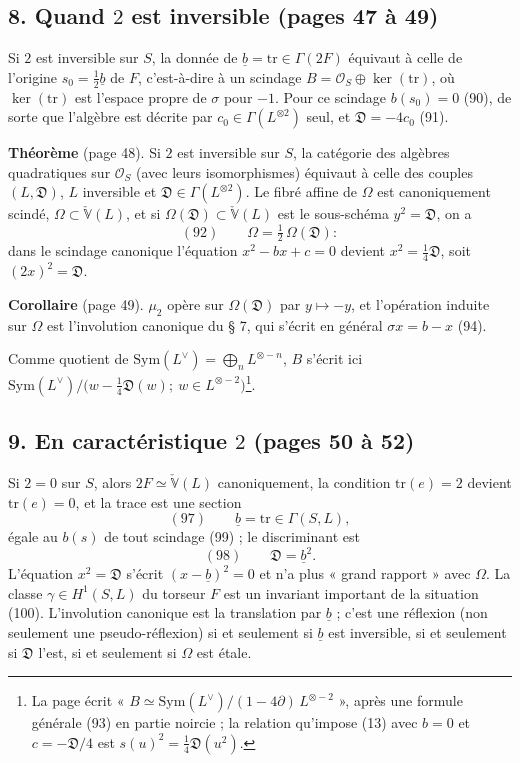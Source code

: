 \documentclass[11pt,a4paper]{article}
\begin{document}
\subsection*{8. Quand $2$ est inversible (pages 47 à 49)}

Si $2$ est inversible sur $S$, la donnée de $\underline{b} = \mathrm{tr} \in \Gamma(2F)$
équivaut à celle de l'origine $s_0 = \tfrac{1}{2}\underline{b}$ de $F$, c'est-à-dire à
un scindage $B = \mathcal{O}_S \oplus \ker(\mathrm{tr})$, où $\ker(\mathrm{tr})$ est
l'espace propre de $\sigma$ pour $-1$. Pour ce scindage $b(s_0) = 0$ (90), de sorte
que l'algèbre est décrite par $c_0 \in \Gamma(L^{\otimes 2})$ seul, et
$\mathfrak{D} = -4c_0$ (91).

\textbf{Théorème} (page 48). Si $2$ est inversible sur $S$, la catégorie des
algèbres quadratiques sur $\mathcal{O}_S$ (avec leurs isomorphismes) équivaut à celle
des couples $(L, \mathfrak{D})$, $L$ inversible et $\mathfrak{D} \in \Gamma(L^{\otimes
2})$. Le fibré affine de $\Omega$ est canoniquement scindé, $\Omega \subset
\check{\mathbb{V}}(L)$, et si $\Omega(\mathfrak{D}) \subset \check{\mathbb{V}}(L)$ est le
sous-schéma $y^2 = \mathfrak{D}$, on a
\[
  (92) \qquad \Omega = \tfrac{1}{2}\,\Omega(\mathfrak{D}) :
\]
dans le scindage canonique l'équation $x^2 - bx + c = 0$ devient $x^2 =
\tfrac{1}{4}\mathfrak{D}$, soit $(2x)^2 = \mathfrak{D}$.

\textbf{Corollaire} (page 49). $\mu_2$ opère sur $\Omega(\mathfrak{D})$ par $y \mapsto
-y$, et l'opération induite sur $\Omega$ est l'involution canonique du § 7, qui
s'écrit en général $\sigma x = b - x$ (94).

Comme quotient de $\mathrm{Sym}(L^{\vee}) = \bigoplus_n L^{\otimes -n}$, $B$ s'écrit
ici $\mathrm{Sym}(L^{\vee})/\bigl(w - \tfrac{1}{4}\mathfrak{D}(w) ;\ w \in L^{\otimes
-2}\bigr)$\footnote{La page écrit « $B \simeq \mathrm{Sym}(L^{\vee})/(1 -
4\partial)\,L^{\otimes -2}$ », après une formule générale (93) en partie noircie ;
la relation qu'impose (13) avec $b = 0$ et $c = -\mathfrak{D}/4$ est $s(u)^2 =
\tfrac{1}{4}\mathfrak{D}(u^2)$.}.

\subsection*{9. En caractéristique $2$ (pages 50 à 52)}

Si $2 = 0$ sur $S$, alors $2F \simeq \check{\mathbb{V}}(L)$ canoniquement, la condition
$\mathrm{tr}(e) = 2$ devient $\mathrm{tr}(e) = 0$, et la trace est une section
\[
  (97) \qquad \underline{b} = \mathrm{tr} \in \Gamma(S, L),
\]
égale au $b(s)$ de tout scindage (99) ; le discriminant est
\[
  (98) \qquad \mathfrak{D} = \underline{b}^2 .
\]
L'équation $x^2 = \mathfrak{D}$ s'écrit $(x - \underline{b})^2 = 0$ et n'a plus « grand
rapport » avec $\Omega$. La classe $\gamma \in H^1(S, L)$ du torseur $F$ est un
invariant important de la situation (100). L'involution canonique est la
translation par $\underline{b}$ ; c'est une réflexion (non seulement une
pseudo-réflexion) si et seulement si $\underline{b}$ est inversible, si et seulement
si $\mathfrak{D}$ l'est, si et seulement si $\Omega$ est étale.
\end{document}
